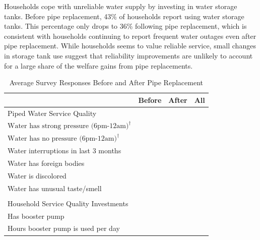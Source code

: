 \documentclass[12pt,table]{article}
\begin{document}
Households cope with unreliable water supply by investing in water storage tanks.  Before pipe replacement, 43\% of households report using water storage tanks.  This percentage only drops to 36\% following pipe replacement, which is consistent with households continuing to report frequent water outages even after pipe replacement.  While households seems to value reliable service, small changes in storage tank use suggest that reliability improvements are unlikely to account for a large share of the welfare gains from pipe replacements.

\begin{table}[h!] 
\centering
\caption{Average Survey Responses Before and After Pipe Replacement}\label{table:descriptives}
\vspace{-2mm}
\begin{threeparttable}
\begin{tabular}{@{}l*{1}{KKK}@{}}
\toprule
  & Before & After  & All \\
\midrule
Piped Water Service Quality \\[.5em]
\hspace{1em}$\text{Water has strong pressure (6pm-12am)}^{\dagger}$ &  \\
\hspace{1em}$\text{Water has no pressure (6pm-12am)}^{\dagger}$  &  \\
\hspace{1em}Water interruptions in last 3 months &  \\
\hspace{1em}Water has foreign bodies &  \\
\hspace{1em}Water is discolored &  \\
\hspace{1em}Water has unusual taste/smell &  \\
\\[-.5em]
Household Service Quality Investments \\[.5em]
\hspace{1em}Has booster pump &  \\
\hspace{1em}Hours booster pump is used per day &  \\

\end{tabular}
\end{threeparttable}
\end{table}
\end{document}
